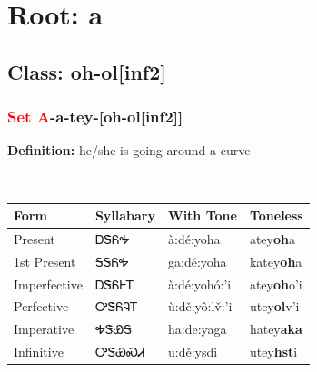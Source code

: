 \needspace{4in}
\section*{Root: a}
\nopagebreak
{}
\needspace{3in}
\subsection*{Class: oh-ol[inf2]}
\nopagebreak
\needspace{2in}
\subsubsection*{\textcolor{Red}{Set A}{-}\textbf{a}{-}tey{-}[oh-ol[inf2]]}
\nopagebreak
\textbf{Definition: } he/she is going around a curve
\\[0.5em]
\begin{tabularx}{\textwidth}{l X X X}%
\toprule%
\textbf{Form}&\textbf{Syllabary}&\textbf{With Tone}&\textbf{Toneless}\\%
\midrule%
Present&ᎠᏕᏲᎭ&à:dé:yoha&atey\textbf{oh}a\\%
1st Present&ᎦᏕᏲᎭ&ga:dé:yoha&katey\textbf{oh}a\\%
Imperfective&ᎠᏕᏲᎰᎢ&à:dé:yohó:’i&atey\textbf{oh}o'i\\%
Perfective&ᎤᏕᏲᎸᎢ&ù:dě:yô:lv̌:’i&utey\textbf{ol}v'i\\%
Imperative&ᎭᏕᏯᎦ&ha:de:yaga&hatey\textbf{aka}\\%
Infinitive&ᎤᏕᏯᏍᏗ&u:dě:ysdi&utey\textbf{hst}i\\%
\bottomrule%
\end{tabularx}
\\[1em]